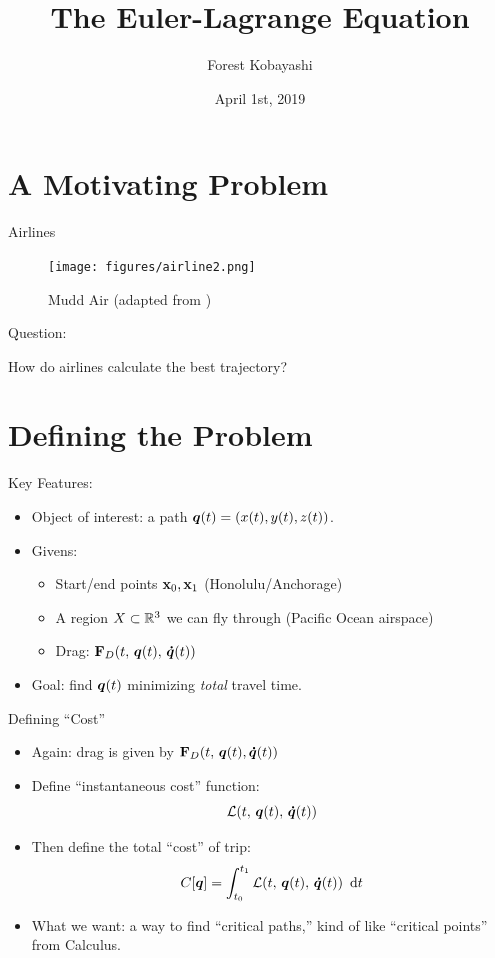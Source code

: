 \documentclass{fkpresentation}
\title{\textmd{The Euler-Lagrange Equation}}
\author{Forest Kobayashi}
\institute{Harvey Mudd College}
\date{April 1st, 2019}
\begin{document}
\frame{\titlepage}
\section{A Motivating Problem}

\begin{frame}{Airlines}
  \begin{figure}[h]
    \centering
    \texttt{[image: figures/airline2.png]}
    \caption{Mudd Air (adapted from \cite{Airplane})}
  \end{figure}
\end{frame}



\begin{frame}{Question:}
  \vfill
  \begin{center}
    \Huge
    How do airlines calculate the best trajectory?
  \end{center}
  \vfill
\end{frame}

\section{Defining the Problem}

\begin{frame}{Key Features:}
  \begin{itemize}
    \item Object of interest: a path $\bm q(t) = (x(t), y(t), z(t))$.
    \item Givens:
      \begin{itemize}
        \item Start/end points $\mathbf{x}_0, \mathbf{x}_1$ (Honolulu/Anchorage)
        \item A region $X \subset \mathbb{R}^3$ we can fly through (Pacific
          Ocean airspace)
        \item Drag: $\mathbf{F}_D(t,\, \bm q(t),\, \bm{\dot{q}}(t))$
      \end{itemize}
    \item Goal: find $\bm q(t)$ minimizing \emph{total} travel time.
  \end{itemize}
\end{frame}

\begin{frame}{Defining ``Cost''}
  \begin{itemize}
    \item Again: drag is given by $\mathbf{F}_D(t,\, \bm q(t),
      \bm{\dot{q}}(t))$
    \item Define ``instantaneous cost'' function:
      \[
        \mathcal{L}(t,\, \bm q(t),\, \bm{\dot q}(t))
      \]
    \item Then define the total ``cost'' of trip:
      \[
        C[\bm q] = \int_{t_0}^{t_1} \mathcal{L}(t,\, \bm q(t),\, \bm{\dot q}(t))
        \mathop{}\,\mathrm{d} t
      \]
    \item What we want: a way to find ``critical paths,'' kind of like
      ``critical points'' from Calculus.
  \end{itemize}
\end{frame}
\end{document}

